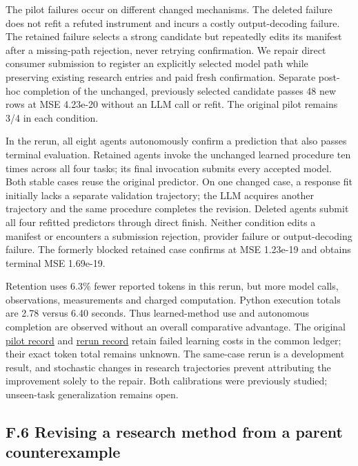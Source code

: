 \documentclass[twoside,11pt]{article}
\begin{document}
The pilot failures occur on different changed mechanisms. The deleted failure
does not refit a refuted instrument and incurs a costly output-decoding failure.
The retained failure selects a strong candidate but repeatedly edits its manifest
after a missing-path rejection, never retrying confirmation. We repair direct
consumer submission to register an explicitly selected model path while preserving
existing research entries and paid fresh confirmation. Separate post-hoc completion
of the unchanged, previously selected candidate passes 48 new rows at MSE 4.23e-20
without an LLM call or refit. The original pilot remains 3/4 in each condition.


In the rerun, all eight agents autonomously confirm a prediction that also passes
terminal evaluation. Retained agents invoke the unchanged learned procedure ten
times across all four tasks; its final invocation submits every accepted model.
Both stable cases reuse the original predictor. On one changed case, a response
fit initially lacks a separate validation trajectory; the LLM acquires another
trajectory and the same procedure completes the revision. Deleted agents submit
all four refitted predictors through direct finish. Neither condition edits a
manifest or encounters a submission rejection, provider failure or output-decoding
failure. The formerly blocked retained case confirms at MSE 1.23e-19 and obtains
terminal MSE 1.69e-19.


Retention uses 6.3\% fewer reported tokens in this rerun, but more model calls,
observations, measurements and charged computation. Python execution totals are
2.78 versus 6.40 seconds. Thus learned-method use and autonomous completion are
observed without an overall comparative advantage. The original
\hyperlink{artifact-67}{pilot record}
and \hyperlink{artifact-68}{rerun record}
retain failed learning costs in the common ledger; their exact token total remains
unknown. The same-case rerun is a development result, and stochastic changes in
research trajectories prevent attributing the improvement solely to the repair.
Both calibrations were previously studied; unseen-task generalization remains open.


\subsection*{F.6 Revising a research method from a parent counterexample}
\end{document}
